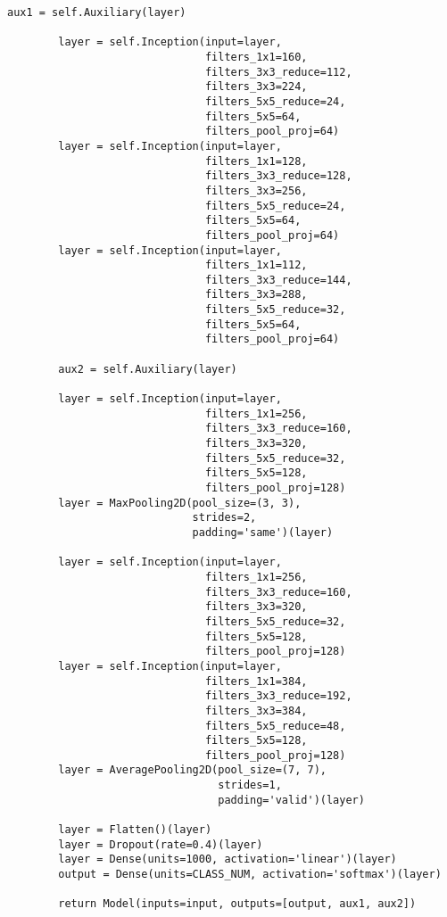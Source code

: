 \begin{lstlisting}[caption=Модель googlenet., label = lst:googlenet, style=realcode]
        aux1 = self.Auxiliary(layer)

        layer = self.Inception(input=layer,
                               filters_1x1=160,
                               filters_3x3_reduce=112,
                               filters_3x3=224,
                               filters_5x5_reduce=24,
                               filters_5x5=64,
                               filters_pool_proj=64)
        layer = self.Inception(input=layer,
                               filters_1x1=128,
                               filters_3x3_reduce=128,
                               filters_3x3=256,
                               filters_5x5_reduce=24,
                               filters_5x5=64,
                               filters_pool_proj=64)
        layer = self.Inception(input=layer,
                               filters_1x1=112,
                               filters_3x3_reduce=144,
                               filters_3x3=288,
                               filters_5x5_reduce=32,
                               filters_5x5=64,
                               filters_pool_proj=64)

        aux2 = self.Auxiliary(layer)

        layer = self.Inception(input=layer,
                               filters_1x1=256,
                               filters_3x3_reduce=160,
                               filters_3x3=320,
                               filters_5x5_reduce=32,
                               filters_5x5=128,
                               filters_pool_proj=128)
        layer = MaxPooling2D(pool_size=(3, 3),
                             strides=2,
                             padding='same')(layer)

        layer = self.Inception(input=layer,
                               filters_1x1=256,
                               filters_3x3_reduce=160,
                               filters_3x3=320,
                               filters_5x5_reduce=32,
                               filters_5x5=128,
                               filters_pool_proj=128)
        layer = self.Inception(input=layer,
                               filters_1x1=384,
                               filters_3x3_reduce=192,
                               filters_3x3=384,
                               filters_5x5_reduce=48,
                               filters_5x5=128,
                               filters_pool_proj=128)
        layer = AveragePooling2D(pool_size=(7, 7),
                                 strides=1,
                                 padding='valid')(layer)

        layer = Flatten()(layer)
        layer = Dropout(rate=0.4)(layer)
        layer = Dense(units=1000, activation='linear')(layer)
        output = Dense(units=CLASS_NUM, activation='softmax')(layer)

        return Model(inputs=input, outputs=[output, aux1, aux2])
\end{lstlisting}

